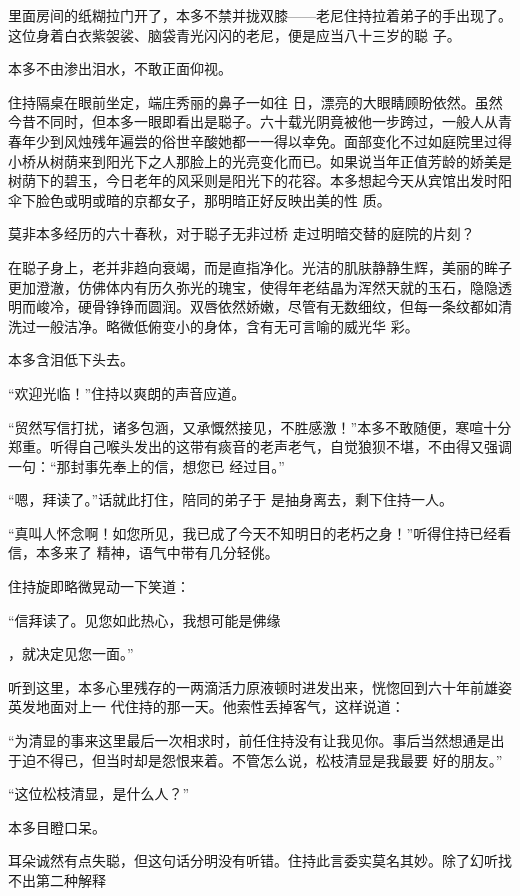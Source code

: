 \documentclass{article}
\begin{document}
里面房间的纸糊拉门开了，本多不禁并拢双膝——老尼住持拉着弟子的手出现了。这位身着白衣紫袈裟、脑袋青光闪闪的老尼，便是应当八十三岁的聪
子。 


本多不由渗出泪水，不敢正面仰视。 

住持隔桌在眼前坐定，端庄秀丽的鼻子一如往
\newpage
日，漂亮的大眼睛顾盼依然。虽然今昔不同时，但本多一眼即看出是聪子。六十载光阴竟被他一步跨过，一般人从青春年少到风烛残年遍尝的俗世辛酸她都一一得以幸免。面部变化不过如庭院里过得小桥从树荫来到阳光下之人那脸上的光亮变化而已。如果说当年正值芳龄的娇美是树荫下的碧玉，今日老年的风采则是阳光下的花容。本多想起今天从宾馆出发时阳伞下脸色或明或暗的京都女子，那明暗正好反映出美的性
质。 

莫非本多经历的六十春秋，对于聪子无非过桥
走过明暗交替的庭院的片刻？ 

在聪子身上，老并非趋向衰竭，而是直指净化。光洁的肌肤静静生辉，美丽的眸子更加澄澈，仿佛体内有历久弥光的瑰宝，使得年老结晶为浑然天就的玉石，隐隐透明而峻冷，硬骨铮铮而圆润。双唇依然娇嫩，尽管有无数细纹，但每一条纹都如清洗过一般洁净。略微低俯变小的身体，含有无可言喻的威光华
彩。 

\newpage


本多含泪低下头去。 


“欢迎光临！”住持以爽朗的声音应道。 

“贸然写信打扰，诸多包涵，又承慨然接见，不胜感激！”本多不敢随便，寒喧十分郑重。听得自己喉头发出的这带有痰音的老声老气，自觉狼狈不堪，不由得又强调一句：“那封事先奉上的信，想您已
经过目。” 

“嗯，拜读了。”话就此打住，陪同的弟子于
是抽身离去，剩下住持一人。 

“真叫人怀念啊！如您所见，我已成了今天不知明日的老朽之身！”听得住持已经看信，本多来了
精神，语气中带有几分轻佻。 


住持旋即略微晃动一下笑道： 

“信拜读了。见您如此热心，我想可能是佛缘

\newpage
，就决定见您一面。” 

听到这里，本多心里残存的一两滴活力原液顿时进发出来，恍惚回到六十年前雄姿英发地面对上一
代住持的那一天。他索性丢掉客气，这样说道： 

“为清显的事来这里最后一次相求时，前任住持没有让我见你。事后当然想通是出于迫不得已，但当时却是怨恨来着。不管怎么说，松枝清显是我最要
好的朋友。” 


“这位松枝清显，是什么人？” 


本多目瞪口呆。 

耳朵诚然有点失聪，但这句话分明没有听错。住持此言委实莫名其妙。除了幻听找不出第二种解释
\end{document}
